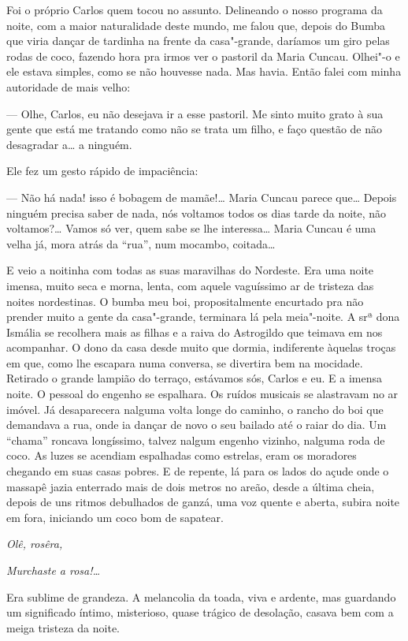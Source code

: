 \begin{linenumbers}
Foi o próprio Carlos quem tocou no assunto. Delineando o nosso programa
da noite, com a maior naturalidade deste mundo, me falou que, depois do
Bumba que viria dançar de tardinha na frente da casa"-grande, daríamos um
giro pelas rodas de coco, fazendo hora pra irmos ver o pastoril da Maria
Cuncau. Olhei"-o e ele estava simples, como se não houvesse nada. Mas
havia. Então falei com minha autoridade de mais velho:

--- Olhe, Carlos, eu não desejava ir a esse pastoril. Me sinto muito
grato à sua gente que está me tratando como não se trata um filho, e
faço questão de não desagradar a\ldots{} a ninguém.

Ele fez um gesto rápido de impaciência:

--- Não há nada! isso é bobagem de mamãe!\ldots{} Maria Cuncau parece que\ldots{}
Depois ninguém precisa saber de nada, nós voltamos todos os dias tarde
da noite, não voltamos?\ldots{} Vamos só ver, quem sabe se lhe interessa\ldots{}
Maria Cuncau é uma velha já, mora atrás da ``rua'', num mocambo,
coitada\ldots{}

E veio a noitinha com todas as suas maravilhas do Nordeste. Era uma
noite imensa, muito seca e morna, lenta, com aquele vaguíssimo ar de
tristeza das noites nordestinas. O bumba meu boi, propositalmente
encurtado pra não prender muito a gente da casa"-grande, terminara lá
pela meia"-noite. A srª dona Ismália se recolhera mais as filhas e a
raiva do Astrogildo que teimava em nos acompanhar. O dono da casa desde
muito que dormia, indiferente àquelas troças em que, como lhe escapara
numa conversa, se divertira bem na mocidade. Retirado o grande lampião
do terraço, estávamos sós, Carlos e eu. E a imensa noite. O pessoal do
engenho se espalhara. Os ruídos musicais se alastravam no ar imóvel. Já
desaparecera nalguma volta longe do caminho, o rancho do boi que
demandava a rua, onde ia dançar de novo o seu bailado até o raiar do
dia. Um ``chama'' roncava longíssimo, talvez nalgum engenho vizinho,
nalguma roda de coco. As luzes se acendiam espalhadas como estrelas,
eram os moradores chegando em suas casas pobres. E de repente, lá para
os lados do açude onde o massapê jazia enterrado mais de dois metros no
areão, desde a última cheia, depois de uns ritmos debulhados de ganzá,
uma voz quente e aberta, subira noite em fora, iniciando um coco bom de
sapatear.

\emph{Olê, rosêra,}

\emph{Murchaste a rosa!\ldots{}}

Era sublime de grandeza. A melancolia da toada, viva e ardente, mas
guardando um significado íntimo, misterioso, quase trágico de desolação,
casava bem com a meiga tristeza da noite.


\end{linenumbers}
